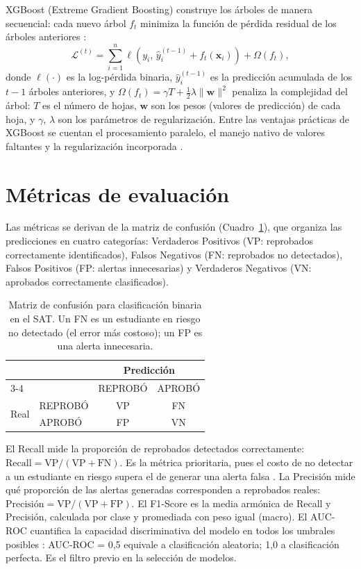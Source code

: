 \documentclass[12pt, letterpaper, openany]{report}
\begin{document}
XGBoost (Extreme Gradient Boosting) construye los árboles de manera secuencial: cada nuevo árbol $f_t$ minimiza la función de pérdida residual de los árboles anteriores \cite{Chen2016}:
\begin{equation}
  \mathcal{L}^{(t)} =
    \sum_{i=1}^{n}
    \ell\!\left(y_i,\, \hat{y}_i^{(t-1)} + f_t(\mathbf{x}_i)\right)
    + \Omega(f_t),
\end{equation}
donde $\ell(\cdot)$ es la log-pérdida binaria, $\hat{y}_i^{(t-1)}$ es la predicción acumulada de los $t-1$ árboles anteriores, y $\Omega(f_t) = \gamma T + \frac{1}{2}\lambda\|\mathbf{w}\|^2$ penaliza la complejidad del árbol: $T$ es el número de hojas, $\mathbf{w}$ son los pesos (valores de predicción) de cada hoja, y $\gamma$, $\lambda$ son los parámetros de regularización. Entre las ventajas prácticas de XGBoost se cuentan el procesamiento paralelo, el manejo nativo de valores faltantes y la regularización incorporada \cite{Chen2016}.

\section{Métricas de evaluación}

Las métricas se derivan de la matriz de confusión (Cuadro~\ref{tab:confusion}), que organiza las predicciones en cuatro categorías: Verdaderos Positivos (VP: reprobados correctamente identificados), Falsos Negativos (FN: reprobados no detectados), Falsos Positivos (FP: alertas innecesarias) y Verdaderos Negativos (VN: aprobados correctamente clasificados).

\begin{table}[htbp]
  \centering
  \caption{Matriz de confusión para clasificación binaria en el SAT. Un FN es un estudiante en riesgo no detectado (el error más costoso); un FP es una alerta innecesaria.}
  \label{tab:confusion}
  \begin{tabular}{llcc}
    \toprule
    & & \multicolumn{2}{c}{Predicción} \\
    \cmidrule(l){3-4}
    & & REPROBÓ & APROBÓ \\
    \midrule
    \multirow{2}{*}{Real}
      & REPROBÓ & VP & FN \\
      & APROBÓ  & FP & VN \\
    \bottomrule
  \end{tabular}
\end{table}

El Recall mide la proporción de reprobados detectados correctamente: $\text{Recall} = \text{VP} / (\text{VP} + \text{FN})$. Es la métrica prioritaria, pues el costo de no detectar a un estudiante en riesgo supera el de generar una alerta falsa \cite{Lopez2021}. La Precisión mide qué proporción de las alertas generadas corresponden a reprobados reales: $\text{Precisión} = \text{VP} / (\text{VP} + \text{FP})$. El F1-Score es la media armónica de Recall y Precisión, calculada por clase y promediada con peso igual (macro). El AUC-ROC cuantifica la capacidad discriminativa del modelo en todos los umbrales posibles \cite{Fawcett2006}: AUC-ROC = 0,5 equivale a clasificación aleatoria; 1,0 a clasificación perfecta. Es el filtro previo en la selección de modelos.
\end{document}
